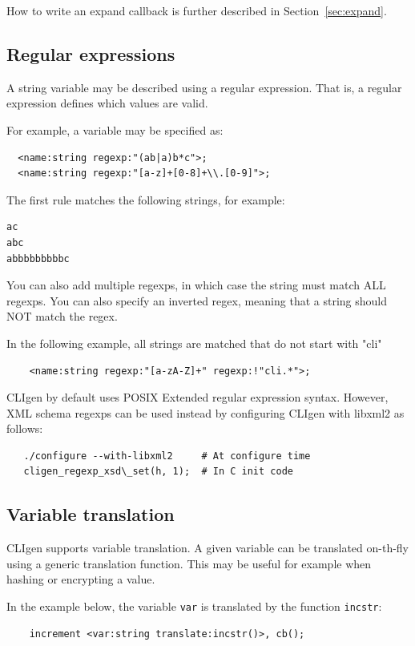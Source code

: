 \documentclass[a4paper, 10pt] {article}
\begin{document}
How to write an expand callback is further described in
Section~\ref{sec:expand}.

\subsection{Regular expressions}

A string variable may be described using a regular expression. That
is, a regular expression defines which values are valid. 

For example, a variable may be specified as:
\begin{verbatim}
  <name:string regexp:"(ab|a)b*c">;
  <name:string regexp:"[a-z]+[0-8]+\\.[0-9]">;
\end{verbatim}
The first rule matches the following strings, for example:
\begin{verbatim}
ac
abc
abbbbbbbbbc
\end{verbatim}

You can also add multiple regexps, in which case the string must match ALL regexps. You can also specify an inverted regex, meaning that a string should NOT match the regex.

In the following example, all strings are matched that do not start with "cli"
\begin{verbatim}
    <name:string regexp:"[a-zA-Z]+" regexp:!"cli.*">;
\end{verbatim}

CLIgen by default uses POSIX Extended regular expression syntax.
However, XML schema regexps can be used instead by configuring CLIgen with libxml2 as follows:
\begin{verbatim}
   ./configure --with-libxml2     # At configure time
   cligen_regexp_xsd\_set(h, 1);  # In C init code
\end{verbatim}

\subsection{Variable translation}

CLIgen supports variable translation. A given variable can be
translated on-th-fly using a generic translation function. This may be useful for example when hashing or encrypting a value.

In the example below, the variable {\tt var} is translated by the function {\tt incstr}:
\begin{verbatim}
    increment <var:string translate:incstr()>, cb();
\end{verbatim}
\end{document}
